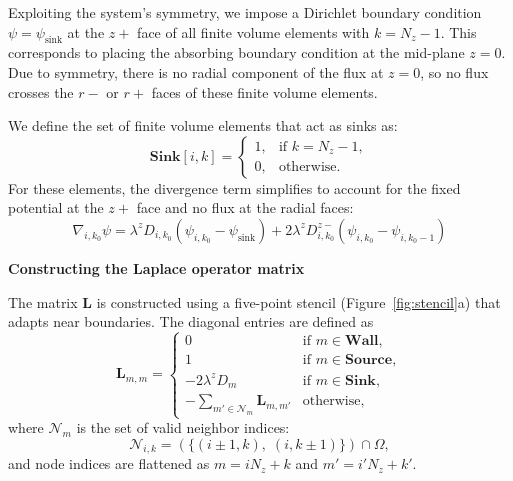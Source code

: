 \documentclass[10pt, a4paper, twocolumn]{article}
\begin{document}
Exploiting the system's symmetry, we impose a Dirichlet boundary condition $\psi = \psi_{\text{sink}}$ at the $z+$ face of all finite volume elements with $k = N_z - 1$.
This corresponds to placing the absorbing boundary condition at the mid-plane $z = 0$.
Due to symmetry, there is no radial component of the flux at $z = 0$, so no flux crosses the $r-$ or $r+$ faces of these finite volume elements.

We define the set of finite volume elements that act as sinks as:
\begin{equation}
    \textbf{Sink}[i,k] =
    \begin{cases}
    1, & \text{if } k = N_z - 1, \\
    0, & \text{otherwise}.
    \end{cases}
\end{equation}
For these elements, the divergence term simplifies to account for the fixed potential at the $z+$ face and no flux at the radial faces:
\begin{equation}
    \nabla_{i,k_0} \psi =
    \lambda^{z} D_{i,k_0} (\psi_{i,k_0} - \psi_{\text{sink}})
    + 2 \lambda^{z} D_{i,k_0}^{z-} (\psi_{i,k_0} - \psi_{i,k_0-1})
\end{equation}

\bigskip
\textbf{Constructing the Laplace operator matrix}

The matrix $\mathbf{L}$ is constructed using a five-point stencil (Figure~\ref{fig:stencil}a) that adapts near boundaries.
The diagonal entries are defined as
\begin{equation}
  \bm{L}_{m,m} = 
  \begin{cases}
    0 & \text{if } m \in \textbf{Wall}, \\
    1 & \text{if } m \in \textbf{Source}, \\
    - 2 \lambda^{z} D_m & \text{if } m \in \textbf{Sink}, \\
    -\!\!\!\sum\limits_{m' \in \mathcal{N}_m} \bm{L}_{m, m'} & \text{otherwise},
  \end{cases}
  \label{eq:L_diag}
\end{equation}
where $\mathcal{N}_m$ is the set of valid neighbor indices:
\begin{equation}
  \mathcal{N}_{i,k} = \left( \{(i \pm 1, k),\; (i, k \pm 1)\} \right) \cap \Omega,
  \label{eq:neighbors}
\end{equation}
and node indices are flattened as $m = i N_z + k$ and $m' = i' N_z + k'$.
\end{document}
